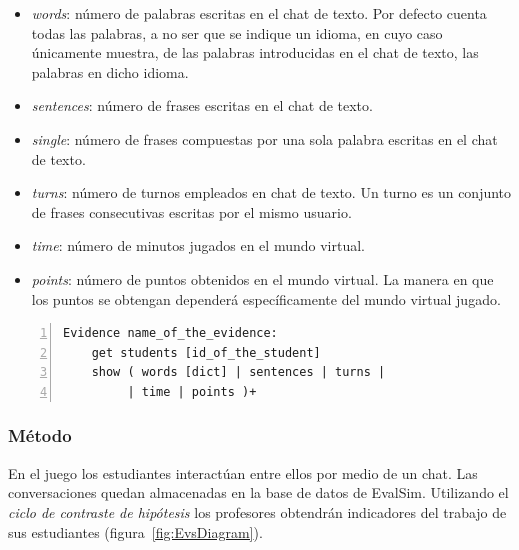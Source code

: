 \begin{itemize}
\item \emph{words}: número de palabras escritas en el chat de texto. Por defecto cuenta todas las palabras, a no ser que se indique un idioma, en cuyo caso únicamente muestra, de las palabras introducidas en el chat de texto, las palabras en dicho idioma.
\item \emph{sentences}: número de frases escritas en el chat de texto.
\item \emph{single}: número de frases compuestas por una sola palabra escritas en el chat de texto.
\item \emph{turns}: número de turnos empleados en chat de texto. Un turno es un conjunto de frases consecutivas escritas por el mismo usuario.
\item \emph{time}: número de minutos jugados en el mundo virtual.
\item \emph{points}: número de puntos obtenidos en el mundo virtual. La manera en que los puntos se obtengan dependerá específicamente del mundo virtual jugado.
\end{itemize}

\begin{lstlisting}[caption=Palabras reservadas y formato de VWQL (version 0.1), label=code:reserved,numbers=left, captionpos=b, morekeywords={Evidence,get, students, show, words, sentences, turns, time, points}]
Evidence name_of_the_evidence:
    get students [id_of_the_student]
    show ( words [dict] | sentences | turns |
         | time | points )+
\end{lstlisting}

\subsubsection{Método}

En el juego los estudiantes interactúan entre ellos por medio de un chat. Las conversaciones quedan almacenadas en la base de datos de EvalSim. Utilizando el \emph{ciclo de contraste de hipótesis} los profesores obtendrán indicadores del trabajo de sus estudiantes (figura~\ref{fig:EvsDiagram}).

